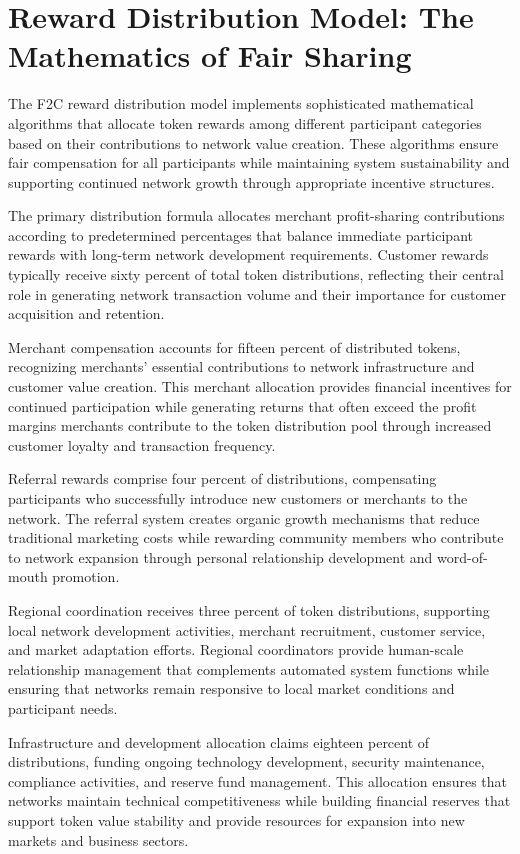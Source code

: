 \documentclass[
  Letterpaper,
]{scrbook}
\begin{document}
\section{Reward Distribution Model: The Mathematics of Fair
Sharing}\label{reward-distribution-model-the-mathematics-of-fair-sharing}

The F2C reward distribution model implements sophisticated mathematical
algorithms that allocate token rewards among different participant
categories based on their contributions to network value creation. These
algorithms ensure fair compensation for all participants while
maintaining system sustainability and supporting continued network
growth through appropriate incentive structures.

The primary distribution formula allocates merchant profit-sharing
contributions according to predetermined percentages that balance
immediate participant rewards with long-term network development
requirements. Customer rewards typically receive sixty percent of total
token distributions, reflecting their central role in generating network
transaction volume and their importance for customer acquisition and
retention.

Merchant compensation accounts for fifteen percent of distributed
tokens, recognizing merchants' essential contributions to network
infrastructure and customer value creation. This merchant allocation
provides financial incentives for continued participation while
generating returns that often exceed the profit margins merchants
contribute to the token distribution pool through increased customer
loyalty and transaction frequency.

Referral rewards comprise four percent of distributions, compensating
participants who successfully introduce new customers or merchants to
the network. The referral system creates organic growth mechanisms that
reduce traditional marketing costs while rewarding community members who
contribute to network expansion through personal relationship
development and word-of-mouth promotion.

Regional coordination receives three percent of token distributions,
supporting local network development activities, merchant recruitment,
customer service, and market adaptation efforts. Regional coordinators
provide human-scale relationship management that complements automated
system functions while ensuring that networks remain responsive to local
market conditions and participant needs.

Infrastructure and development allocation claims eighteen percent of
distributions, funding ongoing technology development, security
maintenance, compliance activities, and reserve fund management. This
allocation ensures that networks maintain technical competitiveness
while building financial reserves that support token value stability and
provide resources for expansion into new markets and business sectors.
\end{document}

